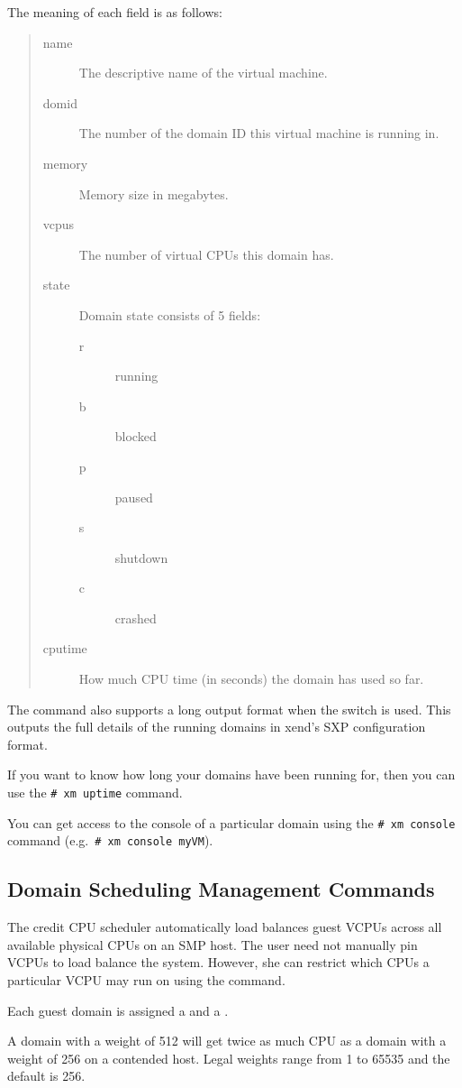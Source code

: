 \documentclass[11pt,twoside,final,openright]{report}
\def\xend{{xend}\xspace}
\begin{document}
The meaning of each field is as follows: 
\begin{quote}
  \begin{description}
  \item[name] The descriptive name of the virtual machine.
  \item[domid] The number of the domain ID this virtual machine is
    running in.
  \item[memory] Memory size in megabytes.
  \item[vcpus] The number of virtual CPUs this domain has.
  \item[state] Domain state consists of 5 fields:
    \begin{description}
    \item[r] running
    \item[b] blocked
    \item[p] paused
    \item[s] shutdown
    \item[c] crashed
    \end{description}
  \item[cputime] How much CPU time (in seconds) the domain has used so
    far.
  \end{description}
\end{quote}

The  command also supports a long output format when the
 switch is used.  This outputs the full details of the
running domains in \xend's SXP configuration format.

If you want to know how long your domains have been running for, then 
you can use the \verb_# xm uptime_ command.


You can get access to the console of a particular domain using 
the \verb_# xm console_ command  (e.g.\ \verb_# xm console myVM_). 

\subsection{Domain Scheduling Management Commands}

The credit CPU scheduler automatically load balances guest VCPUs
across all available physical CPUs on an SMP host. The user need
not manually pin VCPUs to load balance the system. However, she
can restrict which CPUs a particular VCPU may run on using
the  command.

Each guest domain is assigned a  and a .

A domain with a weight of 512 will get twice as much CPU as a
domain with a weight of 256 on a contended host. Legal weights
range from 1 to 65535 and the default is 256.
\end{document}
